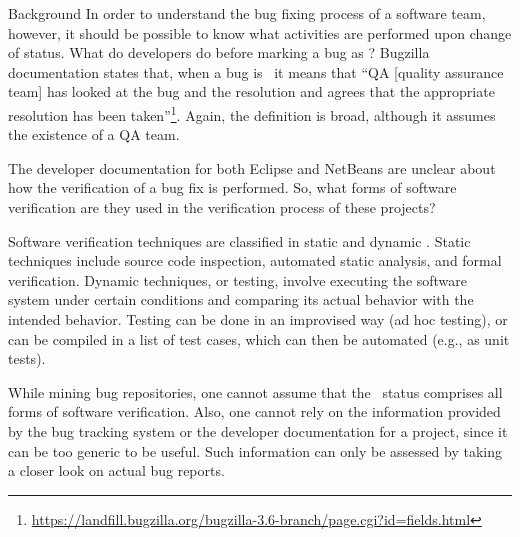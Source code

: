 \begin{section}{Background}
In order to understand the bug fixing process of a software team, however, it should be possible to know what activities are performed upon change of status. 
%
What do developers do before marking a bug as \VERIFIED? Bugzilla documentation states that, when a bug is \VERIFIED\, it means that ``QA [quality assurance team] has looked at the bug and the resolution and agrees that the appropriate resolution has been taken''\footnote{\url{https://landfill.bugzilla.org/bugzilla-3.6-branch/page.cgi?id=fields.html}}. Again, the definition is broad, although it assumes the existence of a QA team.

The developer documentation for both Eclipse and NetBeans are unclear about how the verification of a bug fix is performed. So, what forms of  software verification are they used in the verification process of these projects?

Software verification techniques are classified in static and dynamic \cite{Sommerville1995}. Static techniques include source code inspection, automated static analysis, and formal verification. Dynamic techniques, or testing, involve executing the software system under certain conditions and comparing its actual behavior with the intended behavior. Testing can be done in an improvised way (ad hoc testing), or can be compiled in a list of test cases, which can then be automated (e.g., as unit tests).

While mining bug repositories, one cannot assume that the \VERIFIED\ status comprises all forms of software verification. Also, one cannot rely on the information provided by the bug tracking system or the developer documentation for a project, since it can be too generic to be useful. Such information can only be assessed by taking a closer look on actual bug reports.


\end{section}

